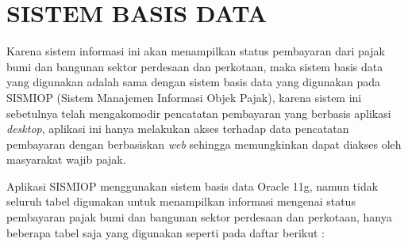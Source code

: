 \chapter{SISTEM BASIS DATA}

Karena sistem informasi ini akan menampilkan status pembayaran dari pajak bumi dan bangunan sektor perdesaan dan perkotaan, maka sistem basis data yang digunakan adalah sama dengan sistem basis data yang digunakan pada SISMIOP (Sistem Manajemen Informasi Objek Pajak), karena sistem ini sebetulnya telah mengakomodir pencatatan pembayaran yang berbasis aplikasi \textit{desktop}, aplikasi ini hanya melakukan akses terhadap data pencatatan pembayaran dengan berbasiskan \textit{web} sehingga memungkinkan dapat diakses oleh masyarakat wajib pajak.

Aplikasi SISMIOP menggunakan sistem basis data Oracle 11g, namun tidak seluruh tabel digunakan untuk menampilkan informasi mengenai status pembayaran pajak bumi dan bangunan sektor perdesaan dan perkotaan, hanya beberapa tabel saja yang digunakan seperti pada daftar berikut :

